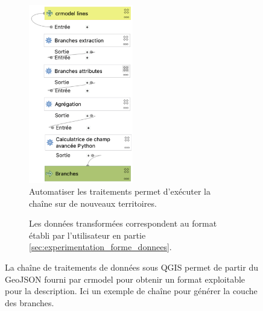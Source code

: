 \begin{figure}[ht]
    \centering
    \begin{subfigure}[t]{.49\linewidth}
        \centering
        \includegraphics[width=0.5\textwidth]{images/experimentation/pipeline_processing_crmodel.png}
        \caption{Automatiser les traitements permet d'exécuter la chaîne sur de nouveaux territoires.}
        \label{fig:experimentation_transformation_qgis}
    \end{subfigure}
    \hfill
    \begin{subfigure}[t]{.49\linewidth}
        \centering
        \caption{Les données transformées correspondent au format établi par l'utilisateur en partie \ref{sec:experimentation_forme_donnees}.}
        \label{fig:experimentation_transformation_resultat_qgis}
    \end{subfigure}
    \caption[Chaîne de traitement de données sous QGIS]{La chaîne de traitements de données sous QGIS permet de partir du GeoJSON fourni par crmodel pour obtenir un format exploitable pour la description. Ici un exemple de chaîne pour générer la couche des branches.}
    \label{fig:experimentation_chaine_donnees_qgis}
\end{figure}

